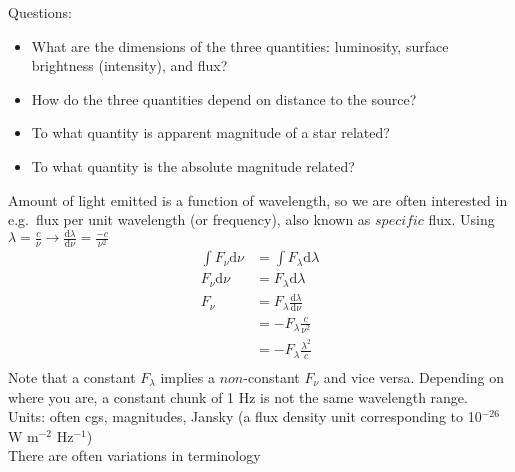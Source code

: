 \documentclass[12pt]{article}
\begin{document}
Questions:
\begin{itemize}
    \item What are the dimensions of the three quantities: luminosity,
        surface brightness (intensity), and flux?
    \item How do the three quantities depend on distance to the source?
    \item To what quantity is apparent magnitude of a star related?
    \item To what quantity is the absolute magnitude related?
\end{itemize}
Amount of light emitted is a function of wavelength, so we are often interested
in e.g.\ flux per unit wavelength (or frequency), also known as $specific$
flux. Using $\lambda=\frac{c}{\nu} \rightarrow
\frac{\textrm{d}\lambda}{\textrm{d}\nu} = \frac{-c}{\nu^2}$
\begin{align*}
    \int F_{\nu} \textrm{d} \nu &= \int F_{\lambda} \textrm{d} \lambda\\
    F_{\nu} \textrm{d} \nu &= F_{\lambda} \textrm{d} \lambda\\
    F_{\nu} &= F_{\lambda} \frac{\textrm{d} \lambda}{\textrm{d}\nu}\\
    &= -F_{\lambda} \frac{c}{\nu^2}\\
    &= -F_{\lambda} \frac{\lambda^2}{c}\\
\end{align*}
Note that a constant $F_{\lambda}$ implies a $non$-constant $F_{\nu}$
and vice versa. Depending on where you are, a constant chunk of 1 Hz is
not the same wavelength range.\\

\noindent Units: often cgs, magnitudes, Jansky (a flux density unit
corresponding to 10$^{-26}$ W m$^{-2}$ Hz$^{-1}$)\\

\noindent There are often variations in terminology\\
\end{document}
